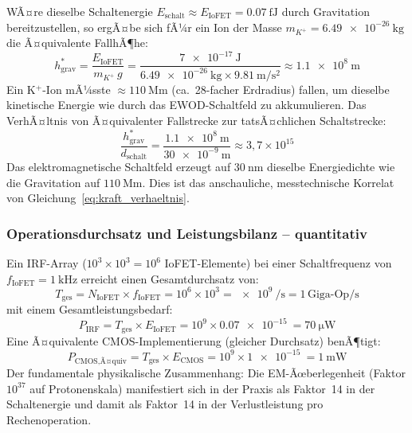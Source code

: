 ﻿\documentclass[12pt, a4paper]{report}
\theoremstyle{definition}
\theoremstyle{remark}
\begin{document}
WÃ¤re dieselbe Schaltenergie
$E_\text{schalt} \approx E_\text{IoFET} = \SI{0.07}{\femto\joule}$
durch Gravitation bereitzustellen, so ergÃ¤be sich fÃ¼r ein Ion der Masse
$m_{K^+} = \SI{6.49e-26}{\kilogram}$ die Ã¤quivalente FallhÃ¶he:
\begin{equation}
  h_\text{grav}^*
  = \frac{E_\text{IoFET}}{m_{K^+}\, g}
  = \frac{\SI{7e-17}{\joule}}%
         {\SI{6.49e-26}{\kilogram} \times \SI{9.81}{\metre\per\second\squared}}
  \approx \SI{1.1e8}{\metre}
  \label{eq:h_grav_aequiv}
\end{equation}
Ein K$^+$-Ion mÃ¼sste $\approx\SI{110}{\mega\metre}$
(ca.\ 28-facher Erdradius) fallen, um dieselbe kinetische Energie wie durch
das EWOD-Schaltfeld zu akkumulieren. Das VerhÃ¤ltnis von Ã¤quivalenter
Fallstrecke zur tatsÃ¤chlichen Schaltstrecke:
\begin{equation}
  \frac{h_\text{grav}^*}{d_\text{schalt}}
  = \frac{\SI{1.1e8}{\metre}}{\SI{30e-9}{\metre}}
  \approx 3{,}7 \times 10^{15}
  \label{eq:h_ratio}
\end{equation}
Das elektromagnetische Schaltfeld erzeugt auf $\SI{30}{\nano\metre}$
dieselbe Energiedichte wie die Gravitation auf $\SI{110}{\mega\metre}$.
Dies ist das anschauliche, messtechnische Korrelat von
Gleichung~\eqref{eq:kraft_verhaeltnis}.

\subsubsection{Operationsdurchsatz und Leistungsbilanz -- quantitativ}

Ein IRF-Array ($10^3 \times 10^3 = 10^6$ IoFET-Elemente) bei einer
Schaltfrequenz von $f_\text{IoFET} = \SI{1}{\kilo\hertz}$ erreicht einen
Gesamtdurchsatz von:
\begin{equation}
  T_\text{ges}
  = N_\text{IoFET} \times f_\text{IoFET}
  = 10^6 \times 10^3
  = \SI{e9}{\per\second}
  = 1\,\text{Giga-Op/s}
  \label{eq:throughput_irf}
\end{equation}
mit einem Gesamtleistungsbedarf:
\begin{equation}
  P_\text{IRF}
  = T_\text{ges} \times E_\text{IoFET}
  = 10^9 \times \SI{0.07e-15}{}
  = \SI{70}{\micro\watt}
  \label{eq:p_irf}
\end{equation}
Eine Ã¤quivalente CMOS-Implementierung (gleicher Durchsatz) benÃ¶tigt:
\begin{equation}
  P_\text{CMOS,Ã¤quiv}
  = T_\text{ges} \times E_\text{CMOS}
  = 10^9 \times \SI{1e-15}{}
  = \SI{1}{\milli\watt}
  \label{eq:p_cmos_equiv}
\end{equation}
Der fundamentale physikalische Zusammenhang: Die EM-Ãœberlegenheit
(Faktor $10^{37}$ auf Protonenskala) manifestiert sich in der Praxis als
Faktor~14 in der Schaltenergie und damit als Faktor~14 in der
Verlustleistung pro Rechenoperation.
\end{document}
